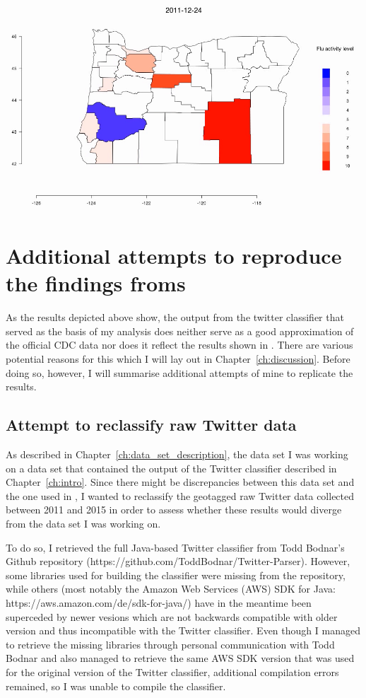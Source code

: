 \documentclass[11pt, a4paper]{report}\usepackage[]{graphicx}\usepackage[]{color}
\begin{document}
\centering \href{run:vids/county_Twitter_cdc_diff_oregon.avi}{\includegraphics[scale=0.5]{vids/Screenshot_Oregon.png}} 
\raggedright

\section{Additional attempts to reproduce the findings froms \citep{bodnar_data_2015}}
As the results depicted above show, the output from the twitter classifier that served as the basis of my analysis does neither serve as a good approximation of the official CDC data nor does it reflect the results shown in \citep{bodnar_data_2015}. There are various potential reasons for this which I will lay out in Chapter~\ref{ch:discussion}. Before doing so, however, I will summarise additional attempts of mine to replicate the results. \newline

\subsection{Attempt to reclassify raw Twitter data}
As described in Chapter~\ref{ch:data_set_description}, the data set I was working on a data set that contained the output of the Twitter classifier described in Chapter~\ref{ch:intro}. Since there might be discrepancies between this data set and the one used in \citep{bodnar_data_2015}, I wanted to reclassify the geotagged raw Twitter data collected between 2011 and 2015 in order to assess whether these results would diverge from the data set I was working on.\newline

To do so, I retrieved the full Java-based Twitter classifier from Todd Bodnar's Github repository (https://github.com/ToddBodnar/Twitter-Parser). However, some libraries used for building the classifier were missing from the repository, while others (most notably the Amazon Web Services (AWS) SDK for Java: https://aws.amazon.com/de/sdk-for-java/) have in the meantime been superceded by newer vesions which are not backwards compatible with older version and thus incompatible with the Twitter classifier. Even though I managed to retrieve the missing libraries through personal communication with Todd Bodnar and also managed to retrieve the same AWS SDK version that was used for the original version of the Twitter classifier, additional compilation errors remained, so I was unable to compile the classifier.\newline
\end{document}
